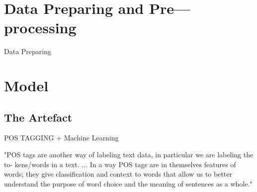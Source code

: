 \section{Data Preparing and Pre---processing}

Data Preparing

\section{Model}






\subsection{The Artefact}

POS TAGGING + Machine Learning

"POS tags are another way of labeling text data, in particular we are labeling the to- kens/words in a text. ... In a way POS tags are in themselves features of words; they give classification and context to words that allow us to better understand the purpose of word choice and the meaning of sentences as a whole."



